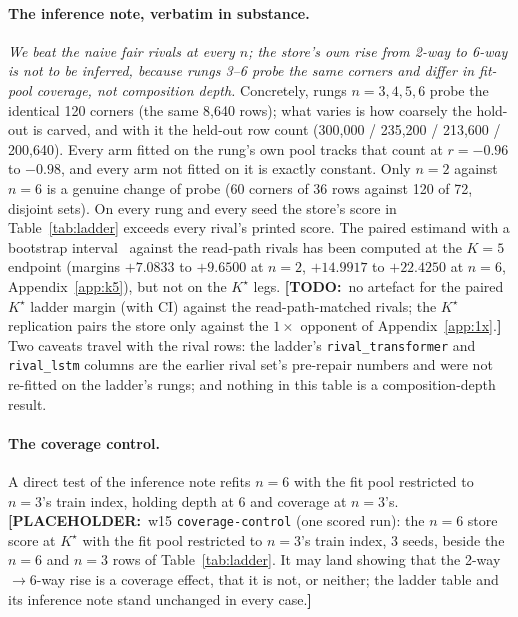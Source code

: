 \documentclass{article} %
\newcommand{\PLACEHOLDER}[1]{{\color{red}\textbf{[PLACEHOLDER:}~#1\textbf{]}}}
\newcommand{\TODO}[1]{{\color{orange}\textbf{[TODO:}~#1\textbf{]}}}
\newcommand{\Kstar}{\ensuremath{K^{\star}}}
\begin{document}
\paragraph{The inference note, verbatim in substance.} \emph{We beat the naive fair rivals at
every $n$; the store's own rise from 2-way to 6-way is not to be inferred, because rungs 3--6
probe the same corners and differ in fit-pool coverage, not composition depth.} Concretely,
rungs $n=3,4,5,6$ probe the identical 120 corners (the same 8,640 rows); what varies is how
coarsely the hold-out is carved, and with it the held-out row count (300,000 / 235,200 /
213,600 / 200,640). Every arm fitted on the rung's own pool tracks that count at
$r=-0.96$ to $-0.98$, and every arm not fitted on it is exactly constant.
Only $n=2$ against $n=6$ is a genuine change of probe (60 corners of 36 rows against 120 of
72, disjoint sets). %
On every rung and every seed the store's score in Table~\ref{tab:ladder} exceeds every
rival's printed score. The paired estimand with a bootstrap interval~\citep{efron1979bootstrap} against the read-path
rivals has been computed at the $K=5$ endpoint (margins $+7.0833$ to $+9.6500$ at $n=2$,
$+14.9917$ to $+22.4250$ at $n=6$, Appendix~\ref{app:k5}), but not on the $\Kstar$ legs.
\TODO{no artefact for the paired $\Kstar$ ladder margin (with CI) against the read-path-matched
rivals; the $\Kstar$ replication pairs the store only against the $1\times$ opponent of
Appendix~\ref{app:1x}.}
Two caveats travel with the rival rows: the ladder's \texttt{rival\_transformer} and
\texttt{rival\_lstm} columns are the earlier rival set's pre-repair numbers and were not
re-fitted on the ladder's rungs; and nothing in this table is a composition-depth result.

\paragraph{The coverage control.} A direct test of the inference note refits $n=6$ with the
fit pool restricted to $n=3$'s train index, holding depth at 6 and coverage at $n=3$'s.
\PLACEHOLDER{w15 \texttt{coverage-control} (one scored run): the $n=6$ store score at $\Kstar$
with the fit pool restricted to $n=3$'s train index, 3 seeds, beside the $n=6$ and $n=3$ rows
of Table~\ref{tab:ladder}. It may land showing that the 2-way$\to$6-way rise is a coverage
effect, that it is not, or neither; the ladder table and its inference note stand unchanged in
every case.}
\end{document}
